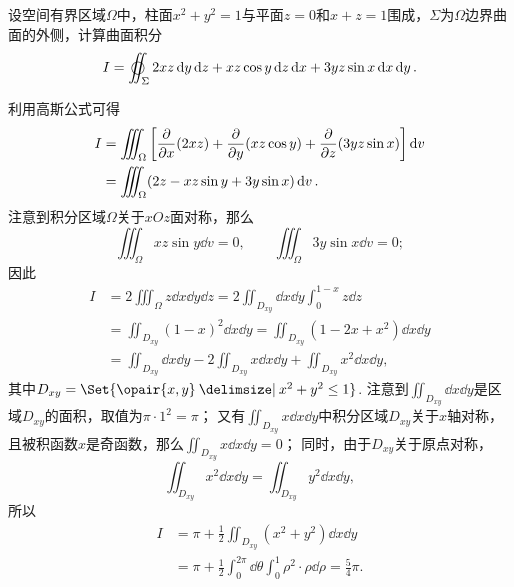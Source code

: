 \begin{example}
设空间有界区域\(\Omega\)中，柱面\(x^2+y^2=1\)与平面\(z=0\)和\(x+z=1\)围成，\(\Sigma\)为\(\Omega\)边界曲面的外侧，计算曲面积分\[
I = \varoiint_{\Sigma} 2xz \dd{y}\dd{z} + xz \cos y \dd{z}\dd{x} + 3yz \sin x \dd{x}\dd{y}.
\]
\begin{solution}
利用高斯公式可得
\begin{align*}
I &= \iiint_{\Omega} \left[ \pdv{x}(2xz) + \pdv{y}(xz \cos y) + \pdv{z}(3yz \sin x) \right] \dd{v} \\
&= \iiint_{\Omega} (2z - xz \sin y + 3y \sin x) \dd{v}.
\end{align*}
注意到积分区域\(\Omega\)关于\(xOz\)面对称，那么\[
\iiint_{\Omega} xz \sin y \dd{v} = 0,
\qquad
\iiint_{\Omega} 3y \sin x \dd{v} = 0;
\]因此\begin{align*}
I &= 2 \iiint_{\Omega} z \dd{x}\dd{y}\dd{z}
= 2 \iint_{D_{xy}} \dd{x}\dd{y} \int_0^{1-x} z \dd{z} \\
&= \iint_{D_{xy}} (1-x)^2 \dd{x}\dd{y}
= \iint_{D_{xy}} (1-2x+x^2) \dd{x}\dd{y} \\
&= \iint_{D_{xy}} \dd{x}\dd{y}
- 2 \iint_{D_{xy}} x \dd{x}\dd{y}
+ \iint_{D_{xy}} x^2 \dd{x}\dd{y},
\end{align*}
其中\(D_{xy} = \Set{\opair{x,y} \given x^2+y^2\leq1}\).
注意到\(\iint_{D_{xy}} \dd{x}\dd{y}\)是区域\(D_{xy}\)的面积，取值为\(\pi\cdot1^2=\pi\)；
又有\(\iint_{D_{xy}} x \dd{x}\dd{y}\)中积分区域\(D_{xy}\)关于\(x\)轴对称，且被积函数\(x\)是奇函数，那么\(\iint_{D_{xy}} x \dd{x}\dd{y} = 0\)；
同时，由于\(D_{xy}\)关于原点对称，\[
\iint_{D_{xy}} x^2 \dd{x}\dd{y} = \iint_{D_{xy}} y^2 \dd{x}\dd{y},
\]所以\begin{align*}
I &= \pi + \frac{1}{2} \iint_{D_{xy}} (x^2+y^2) \dd{x}\dd{y} \\
&= \pi + \frac{1}{2}
	\int_0^{2\pi} \dd{\theta} \int_0^1 \rho^2 \cdot \rho\dd{\rho}
= \frac{5}{4} \pi.
\end{align*}
\end{solution}
\end{example}

